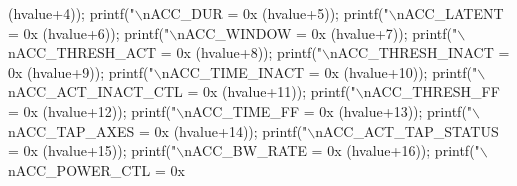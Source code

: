 \begin{DoxyCode}
{{{{{      (hvalue+4));
  printf(\textcolor{stringliteral}{"\(\backslash\)nACC\_DUR = 0x%
      (hvalue+5));
  printf(\textcolor{stringliteral}{"\(\backslash\)nACC\_LATENT = 0x%
      (hvalue+6));
  printf(\textcolor{stringliteral}{"\(\backslash\)nACC\_WINDOW = 0x%
      (hvalue+7));
  printf(\textcolor{stringliteral}{"\(\backslash\)nACC\_THRESH\_ACT = 0x%
      (hvalue+8));
  printf(\textcolor{stringliteral}{"\(\backslash\)nACC\_THRESH\_INACT = 0x%
      (hvalue+9));
  printf(\textcolor{stringliteral}{"\(\backslash\)nACC\_TIME\_INACT = 0x%
      (hvalue+10));
  printf(\textcolor{stringliteral}{"\(\backslash\)nACC\_ACT\_INACT\_CTL = 0x%
      (hvalue+11));
  printf(\textcolor{stringliteral}{"\(\backslash\)nACC\_THRESH\_FF = 0x%
      (hvalue+12));
  printf(\textcolor{stringliteral}{"\(\backslash\)nACC\_TIME\_FF = 0x%
      (hvalue+13));
  printf(\textcolor{stringliteral}{"\(\backslash\)nACC\_TAP\_AXES = 0x%
      (hvalue+14));
  printf(\textcolor{stringliteral}{"\(\backslash\)nACC\_ACT\_TAP\_STATUS = 0x%
      (hvalue+15));
  printf(\textcolor{stringliteral}{"\(\backslash\)nACC\_BW\_RATE = 0x%
      (hvalue+16));
  printf(\textcolor{stringliteral}{"\(\backslash\)nACC\_POWER\_CTL = 0x%
}}}}}}}}}}}}}}}}}}
\end{DoxyCode}
